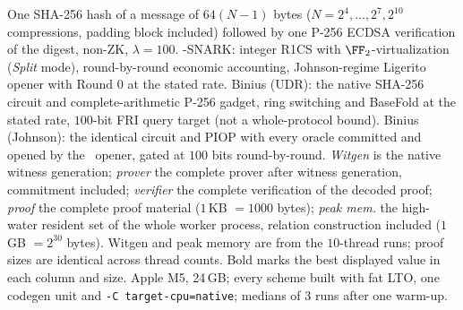 \begin{table}[H]
  \caption{One SHA-256 hash of a message of $64(N-1)$ bytes ($N = 2^4, \ldots, 2^7, 2^{10}$ compressions, padding block included) followed by one P-256 ECDSA verification of the digest, non-ZK, $\lambda = 100$. \ftwoz-SNARK: integer R1CS with $\FF_2$-virtualization (\emph{Split} mode), round-by-round economic accounting, Johnson-regime Ligerito opener with Round 0 at the stated rate. Binius (UDR): the native SHA-256 circuit and complete-arithmetic P-256 gadget, ring switching and BaseFold at the stated rate, $100$-bit FRI query target (not a whole-protocol bound). Binius (Johnson): the identical circuit and PIOP with every oracle committed and opened by the \ftwoz\ opener, gated at $100$ bits round-by-round. \emph{Witgen} is the native witness generation; \emph{prover} the complete prover after witness generation, commitment included; \emph{verifier} the complete verification of the decoded proof; \emph{proof} the complete proof material ($1$\,KB $= 1000$ bytes); \emph{peak mem.} the high-water resident set of the whole worker process, relation construction included ($1$\,GB $= 2^{30}$ bytes). Witgen and peak memory are from the $10$-thread runs; proof sizes are identical across thread counts. Bold marks the best displayed value in each column and size. Apple M5, 24\,GB; every scheme built with fat LTO, one codegen unit and \texttt{-C target-cpu=native}; medians of $3$ runs after one warm-up.}
  \label{tab:sha256-ecdsa}
\end{table}
